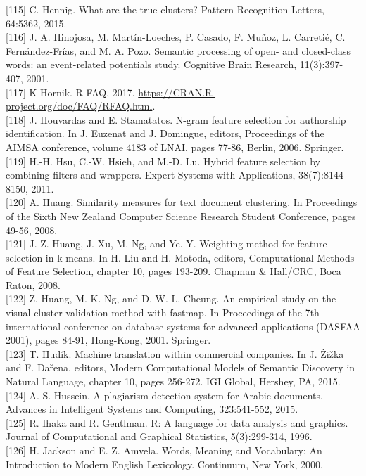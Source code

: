 \documentclass[10pt]{book}
\begin{document}
[115] C. Hennig. What are the true clusters? Pattern Recognition Letters, 64:5362, 2015.\\[0pt]
[116] J. A. Hinojosa, M. Martín-Loeches, P. Casado, F. Muñoz, L. Carretié, C. Fernández-Frías, and M. A. Pozo. Semantic processing of open- and closed-class words: an event-related potentials study. Cognitive Brain Research, 11(3):397-407, 2001.\\[0pt]
[117] K Hornik. R FAQ, 2017. \href{https://CRAN.R-project.org/doc/FAQ/RFAQ.html}{https://CRAN.R-project.org/doc/FAQ/RFAQ.html}.\\[0pt]
[118] J. Houvardas and E. Stamatatos. N-gram feature selection for authorship identification. In J. Euzenat and J. Domingue, editors, Proceedings of the AIMSA conference, volume 4183 of LNAI, pages 77-86, Berlin, 2006. Springer.\\[0pt]
[119] H.-H. Hsu, C.-W. Hsieh, and M.-D. Lu. Hybrid feature selection by combining filters and wrappers. Expert Systems with Applications, 38(7):8144-8150, 2011.\\[0pt]
[120] A. Huang. Similarity measures for text document clustering. In Proceedings of the Sixth New Zealand Computer Science Research Student Conference, pages 49-56, 2008.\\[0pt]
[121] J. Z. Huang, J. Xu, M. Ng, and Ye. Y. Weighting method for feature selection in k-means. In H. Liu and H. Motoda, editors, Computational Methods of Feature Selection, chapter 10, pages 193-209. Chapman \& Hall/CRC, Boca Raton, 2008.\\[0pt]
[122] Z. Huang, M. K. Ng, and D. W.-L. Cheung. An empirical study on the visual cluster validation method with fastmap. In Proceedings of the 7th international conference on database systems for advanced applications (DASFAA 2001), pages 84-91, Hong-Kong, 2001. Springer.\\[0pt]
[123] T. Hudík. Machine translation within commercial companies. In J. Žižka and F. Dařena, editors, Modern Computational Models of Semantic Discovery in Natural Language, chapter 10, pages 256-272. IGI Global, Hershey, PA, 2015.\\[0pt]
[124] A. S. Hussein. A plagiarism detection system for Arabic documents. Advances in Intelligent Systems and Computing, 323:541-552, 2015.\\[0pt]
[125] R. Ihaka and R. Gentlman. R: A language for data analysis and graphics. Journal of Computational and Graphical Statistics, 5(3):299-314, 1996.\\[0pt]
[126] H. Jackson and E. Z. Amvela. Words, Meaning and Vocabulary: An Introduction to Modern English Lexicology. Continuum, New York, 2000.\\[0pt]
\end{document}

